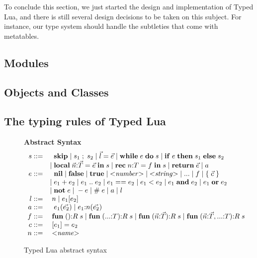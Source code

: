 To conclude this section, we just started the design and
implementation of Typed Lua, and there is still several design
decisions to be taken on this subject.
For instance, our type system should handle the subtleties that
come with metatables.

\subsection{Modules}

\subsection{Objects and Classes}

\subsection{The typing rules of Typed Lua}
\label{sec:rules}

\begin{figure}[!ht]
\textbf{Abstract Syntax}\\
\dstart
$$
\begin{array}{rl}
s ::= & \;\; \mathbf{skip} \; | \;
s_{1} \; ; \; s_{2} \; | \;
\vec{l} = \vec{e}  \; | \;
\mathbf{while} \; e \; \mathbf{do} \; s \; | \;
\mathbf{if} \; e \; \mathbf{then} \; s_{1} \; \mathbf{else} \; s_{2}\\
& | \; \mathbf{local} \; \vec{n}{:}\vec{T} = \vec{e} \; \mathbf{in} \; s \; | \;
\mathbf{rec} \; n{:}T = f \; \mathbf{in} \; s \; | \;
\mathbf{return} \; \vec{e} \; | \;
a\\
e ::= & \;\; \mathbf{nil} \; | \;
\mathbf{false} \; | \;
\mathbf{true} \; | \;
{<}{\it number}{>} \; | \;
{<}{\it string}{>} \; | \;
{...} \; | \;
f \; | \;
\{ \; \vec{c}\; \} \\
& | \; e_{1} + e_{2} \; | \;
e_{1} \; {..} \; e_{2} \; | \;
e_{1} == e_{2} \; | \;
e_{1} < e_{2} \; | \;
e_{1} \; \mathbf{and} \; e_{2} \; | \;
e_{1} \; \mathbf{or} \; e_{2} \\
& | \; \mathbf{not} \; e \; | \;
- e \; | \;
\# \; e \; | \;
a \; | \;
l \\
l ::= & \; n \; | \;
e_{1}[e_{2}]\\
a ::= & \;\; e_{1}(\vec{e_{2}}) \; | \;
e_{1}{:}n(\vec{e_{2}})\\
f ::= & \; \mathbf{fun} \; (){:}R \; s \; | \;
\mathbf{fun} \; ({...}{:}T){:}R \; s \; | \;
\mathbf{fun} \; (\vec{n}{:}\vec{T}){:}R \; s \; | \;
\mathbf{fun} \; (\vec{n}{:}\vec{T},{...}{:}T){:}R \; s\\
c ::= & \; [e_{1}] = e_{2}\\
n ::= & \; {<}{\it name}{>}\\
\end{array}
$$
\dend
\caption{Typed Lua abstract syntax}
\label{fig:syntax}
\end{figure}

